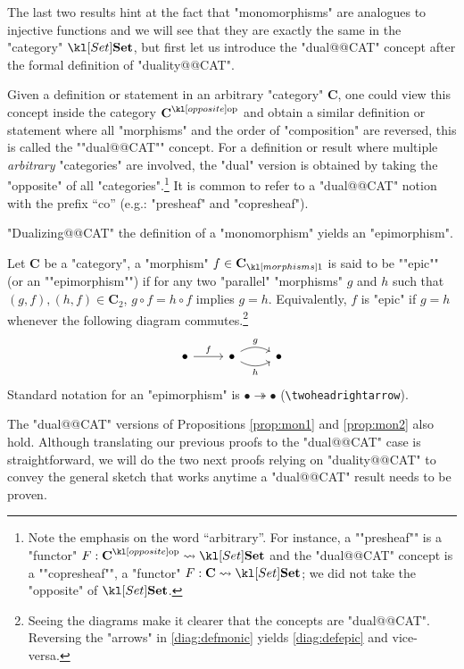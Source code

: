 \documentclass[main.tex]{subfiles}
\begin{document}
The last two results hint at the fact that "monomorphisms" are analogues to injective functions and we will see that they are exactly the same in the "category" $\catSet$, but first let us introduce the "dual@@CAT" concept after the formal definition of "duality@@CAT". 
\begin{defn}[Duality]
	Given a definition or statement in an arbitrary "category" $\mathbf{C}$, one could view this concept inside the category $\op{\mathbf{C}}$ and obtain a similar definition or statement where all "morphisms" and the order of "composition" are reversed, this is called the ""dual@@CAT"" concept. For a definition or result where multiple \emph{arbitrary} "categories" are involved, the "dual" version is obtained by taking the "opposite" of all "categories".\footnote{Note the emphasis on the word ``arbitrary''. \AP For instance, a ""presheaf"" is a "functor" $F: \op{\mathbf{C}} \rightsquigarrow \catSet$ and the "dual@@CAT" concept is a ""copresheaf"", a "functor" $F: \mathbf{C} \rightsquigarrow \catSet$; we did not take the "opposite" of $\catSet$.} It is common to refer to a "dual@@CAT" notion with the prefix ``co'' (e.g.: "presheaf" and "copresheaf").
\end{defn}
"Dualizing@@CAT" the definition of a "monomorphism" yields an "epimorphism".
\begin{defn}[Epimorphism]
	Let $\mathbf{C}$ be a "category", a "morphism" $f \in \mor{\mathbf{C}}$ is said to be ""epic"" (or an ""epimorphism"") if for any two "parallel" "morphisms" $g$ and $h$ such that $(g,f), (h,f) \in \mathbf{C}_2$, $g\circ f = h\circ f$ implies $g = h$. Equivalently, $f$ is "epic" if $g = h$ whenever the following diagram commutes.\footnote{Seeing the diagrams make it clearer that the concepts are "dual@@CAT". Reversing the "arrows" in \eqref{diag:defmonic} yields \eqref{diag:defepic} and vice-versa.}
	\begin{equation}\label{diag:defepic}
	\begin{tikzcd}
	\bullet \arrow[r, "f"] & \bullet \arrow[r, "g", bend left] \arrow[r, "h"', bend right] & \bullet
	\end{tikzcd}
	\end{equation}
	Standard notation for an "epimorphism" is $ \bullet \twoheadrightarrow \bullet$ (\verb!\twoheadrightarrow!).
\end{defn}
The "dual@@CAT" versions of Propositions \ref{prop:mon1} and \ref{prop:mon2} also hold. Although translating our previous proofs to the "dual@@CAT" case is straightforward, we will do the two next proofs relying on "duality@@CAT" to convey the general sketch that works anytime a "dual@@CAT" result needs to be proven.
\end{document}
